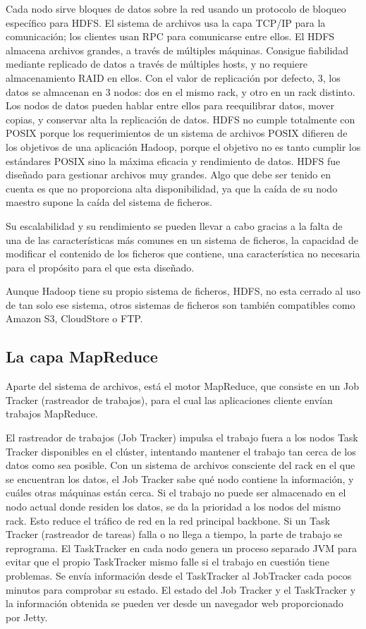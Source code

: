 Cada nodo sirve bloques de datos sobre la red usando un protocolo de bloqueo específico para HDFS. El sistema de archivos usa la capa TCP/IP para la comunicación; los clientes usan RPC para comunicarse entre ellos. El HDFS almacena archivos grandes, a través de múltiples máquinas. Consigue fiabilidad mediante replicado de datos a través de múltiples hosts, y no requiere almacenamiento RAID en ellos. Con el valor de replicación por defecto, 3, los datos se almacenan en 3 nodos: dos en el mismo rack, y otro en un rack distinto. Los nodos de datos pueden hablar entre ellos para reequilibrar datos, mover copias, y conservar alta la replicación de datos. HDFS no cumple totalmente con POSIX porque los requerimientos de un sistema de archivos POSIX difieren de los objetivos de una aplicación Hadoop, porque el objetivo no es tanto cumplir los estándares POSIX sino la máxima eficacia y rendimiento de datos. HDFS fue diseñado para gestionar archivos muy grandes. Algo que debe ser tenido en cuenta es que no proporciona alta disponibilidad, ya que la caída de su nodo maestro supone la caída del sistema de ficheros.

Su escalabilidad y su rendimiento se pueden llevar a cabo gracias a la falta de una de las características m\'as comunes en un sistema de ficheros, la capacidad de modificar el contenido de los ficheros que contiene, una característica no necesaria para el propósito para el que esta dise\~nado.

Aunque Hadoop tiene su propio sistema de ficheros, HDFS, no esta cerrado al uso de tan solo ese sistema, otros sistemas de ficheros son también compatibles como Amazon S3, CloudStore o FTP.

\subsection{La capa MapReduce}

Aparte del sistema de archivos, está el motor MapReduce, que consiste en un Job Tracker (rastreador de trabajos), para el cual las aplicaciones cliente envían trabajos MapReduce.

El rastreador de trabajos (Job Tracker) impulsa el trabajo fuera a los nodos Task Tracker disponibles en el clúster, intentando mantener el trabajo tan cerca de los datos como sea posible. Con un sistema de archivos consciente del rack en el que se encuentran los datos, el Job Tracker sabe qué nodo contiene la información, y cuáles otras máquinas están cerca. Si el trabajo no puede ser almacenado en el nodo actual donde residen los datos, se da la prioridad a los nodos del mismo rack. Esto reduce el tráfico de red en la red principal backbone. Si un Task Tracker (rastreador de tareas) falla o no llega a tiempo, la parte de trabajo se reprograma. El TaskTracker en cada nodo genera un proceso separado JVM para evitar que el propio TaskTracker mismo falle si el trabajo en cuestión tiene problemas. Se envía información desde el TaskTracker al JobTracker cada pocos minutos para comprobar su estado. El estado del Job Tracker y el TaskTracker y la información obtenida se pueden ver desde un navegador web proporcionado por Jetty.

